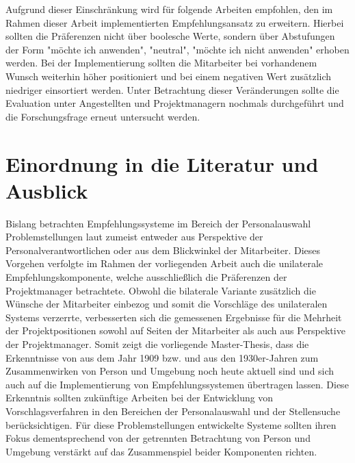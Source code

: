 Aufgrund dieser Einschränkung wird für folgende Arbeiten empfohlen, den im Rahmen dieser Arbeit implementierten Empfehlungsansatz zu erweitern. Hierbei sollten die Präferenzen nicht über boolesche Werte, sondern über Abstufungen der Form "möchte ich anwenden", "neutral", "möchte ich nicht anwenden" erhoben werden. Bei der Implementierung sollten die Mitarbeiter bei vorhandenem Wunsch weiterhin höher positioniert und bei einem negativen Wert zusätzlich niedriger einsortiert werden. Unter Betrachtung dieser Veränderungen sollte die Evaluation unter Angestellten und Projektmanagern nochmals durchgeführt und die Forschungsfrage erneut untersucht werden.

\section{Einordnung in die Literatur und Ausblick}
\label{ch:diskussion:einordnung}
Bislang betrachten Empfehlungssysteme im Bereich der Personalauswahl Problemstellungen laut \textcite[S. 1ff.]{malinowski:2006} zumeist entweder aus Perspektive der Personalverantwortlichen oder aus dem Blickwinkel der Mitarbeiter. Dieses Vorgehen verfolgte im Rahmen der vorliegenden Arbeit auch die unilaterale Empfehlungskomponente, welche ausschließlich die Präferenzen der Projektmanager betrachtete. Obwohl die bilaterale Variante zusätzlich die Wünsche der Mitarbeiter einbezog und somit die Vorschläge des unilateralen Systems verzerrte, verbesserten sich die gemessenen Ergebnisse für die Mehrheit der Projektpositionen sowohl auf Seiten der Mitarbeiter als auch aus Perspektive der Projektmanager. Somit zeigt die vorliegende Master-Thesis, dass die Erkenntnisse von \textcite[S. 5ff.]{parsons:1909} aus dem Jahr 1909 bzw. \textcite[S. 11f.]{lewin:1936} und \textcite[S. 38ff.]{murray:1938} aus den 1930er-Jahren zum Zusammenwirken von Person und Umgebung noch heute aktuell sind und sich auch auf die Implementierung von Empfehlungssystemen übertragen lassen. Diese Erkenntnis sollten zukünftige Arbeiten bei der Entwicklung von Vorschlagsverfahren in den Bereichen der Personalauswahl und der Stellensuche berücksichtigen. Für diese Problemstellungen entwickelte Systeme sollten ihren Fokus dementsprechend von der getrennten Betrachtung von Person und Umgebung verstärkt auf das Zusammenspiel beider Komponenten richten. 
